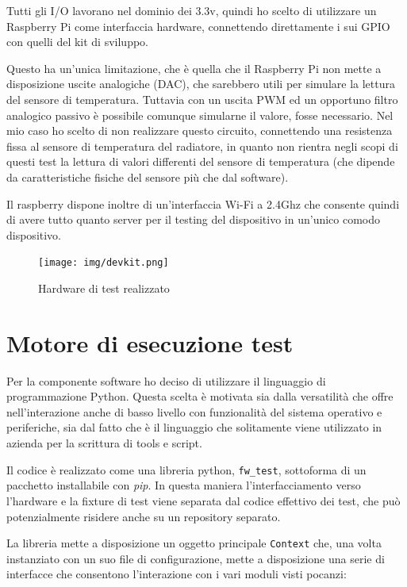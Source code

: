 \documentclass[12pt,a4paper,twoside,titlepage]{book}
\begin{document}
Tutti gli I/O lavorano nel dominio dei 3.3v, quindi ho scelto di utilizzare un
Raspberry Pi come interfaccia hardware, connettendo direttamente i sui GPIO con
quelli del kit di sviluppo.

Questo ha un'unica limitazione, che è quella che il Raspberry Pi non mette a disposizione
uscite analogiche (DAC), che sarebbero utili per simulare la lettura del sensore di
temperatura. Tuttavia con un uscita PWM ed un opportuno filtro analogico passivo è
possibile comunque simularne il valore, fosse necessario. Nel mio caso ho scelto di
non realizzare questo circuito, connettendo una resistenza fissa al sensore di
temperatura del radiatore, in quanto non rientra negli scopi di questi test la lettura
di valori differenti del sensore di temperatura (che dipende da caratteristiche fisiche
del sensore più che dal software).

Il raspberry dispone inoltre di un'interfaccia Wi-Fi a 2.4Ghz che consente quindi di
avere tutto quanto server per il testing del dispositivo in un'unico comodo dispositivo.

\begin{figure}
    \centering
    \texttt{[image: img/devkit.png]}
    \caption{Hardware di test realizzato}
    \label{fig:quadretto}
\end{figure}

\section{Motore di esecuzione test}

Per la componente software ho deciso di utilizzare il linguaggio di programmazione
Python. Questa scelta è motivata sia dalla versatilità che offre nell'interazione anche
di basso livello con funzionalità del sistema operativo e periferiche, sia dal fatto
che è il linguaggio che solitamente viene utilizzato in azienda per la scrittura di
tools e script.

Il codice è realizzato come una libreria python, \texttt{fw\_test}, sottoforma di
un pacchetto installabile con \textit{pip}. In questa maniera l'interfacciamento
verso l'hardware e la fixture di test viene separata dal codice effettivo dei test,
che può potenzialmente risidere anche su un repository separato.

La libreria mette a disposizione un oggetto principale \texttt{Context} che, una
volta instanziato con un suo file di configurazione, mette a disposizione una serie
di interfacce che consentono l'interazione con i vari moduli visti pocanzi:
\end{document}
